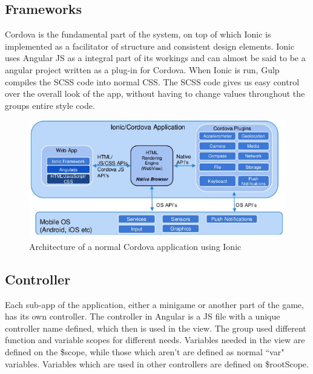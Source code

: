 \subsection{Frameworks}
Cordova is the fundamental part of the system, on top of which Ionic is implemented as a facilitator of structure and consistent design elements. Ionic uses Angular JS as a integral part of its workings \cite{ionic3} and can almost be said to be a angular project written as a plug-in for Cordova. When Ionic is run, Gulp compiles the SCSS code into normal CSS. The SCSS code gives us easy control over the overall look of the app, without having to change values throughout the groups entire style code.

\begin{figure}[h]
    \centering
    \includegraphics[scale=0.5]{images/mobile-app-architechure.png}
    \caption{Architecture of a normal Cordova application using Ionic}
    \label{fig:framework_architecture}
\end{figure}


\subsection{Controller}
Each sub-app of the application, either a minigame or another part of the game, has its own controller. The controller in Angular is a JS file with a unique controller name defined, which then is used in the view. The group used different function and variable scopes for different needs. Variables needed in the view are defined on the \$scope, while those which aren't are defined as normal ``var" variables. Variables which are used in other controllers are defined on \$rootScope.

